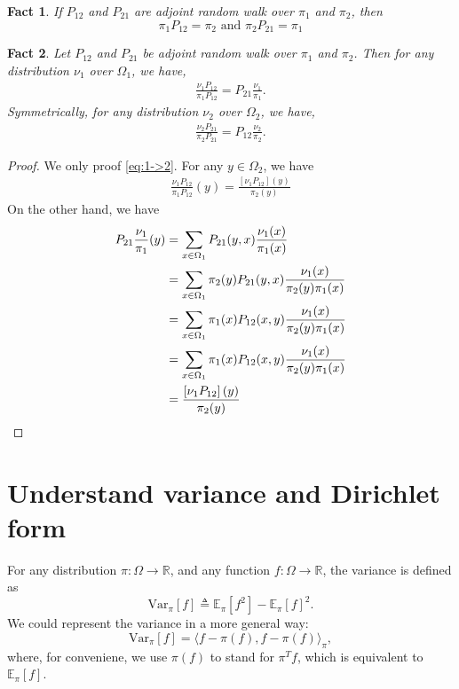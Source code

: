 \documentclass{article}
\newtheorem{fact}{Fact}
\def\<{\langle}
\def\>{\rangle}
\def\Var{\mathrm{Var}}
\def\E{\mathbb{E}}
\begin{document}
\begin{fact}
  If $P_{12}$ and $P_{21}$ are \emph{adjoint random walk} over $\pi_1$ and $\pi_2$, then
  \[\pi_1P_{12} = \pi_2 \mbox{ and } \pi_2P_{21} = \pi_1\]
\end{fact}

\begin{fact}
  Let $P_{12}$ and $P_{21}$ be \emph{adjoint random walk} over $\pi_1$ and $\pi_2$.
  Then for any distribution $\nu_1$ over $\Omega_1$, we have,
  \begin{align} \label{eq:1->2}
    \frac{\nu_1 P_{12}}{\pi_1 P_{12}} = P_{21} \frac{\nu_1}{\pi_1}.
  \end{align}
  Symmetrically, for any distribution $\nu_2$ over $\Omega_2$, we have,
  \begin{align}
    \frac{\nu_2 P_{21}}{\pi_2 P_{21}} = P_{12} \frac{\nu_2}{\pi_2}.
  \end{align}
\end{fact}
\begin{proof}
  We only proof \eqref{eq:1->2}.
  For any $y \in \Omega_2$, we have
  \begin{align*}
    \frac{\nu_1 P_{12}}{\pi_1 P_{12}} (y) = \frac{\left[\nu_1P_{12}\right](y)}{\pi_2(y)}
  \end{align*}
  On the other hand, we have
  \begin{align*}
    P_{21}\frac{\nu_1}{\pi_1} (y)
    &= \sum_{x\in\Omega_1} P_{21}(y, x) \frac{\nu_1(x)}{\pi_1(x)} \\
    &= \sum_{x\in\Omega_1} \pi_2(y)P_{21}(y, x) \frac{\nu_1(x)}{\pi_2(y)\pi_1(x)} \\
    &= \sum_{x\in\Omega_1} \pi_1(x)P_{12}(x, y) \frac{\nu_1(x)}{\pi_2(y)\pi_1(x)} \\
    &= \sum_{x\in\Omega_1} \pi_1(x)P_{12}(x, y) \frac{\nu_1(x)}{\pi_2(y)\pi_1(x)} \\
    &= \frac{\left[\nu_1P_{12}\right](y)}{\pi_2(y)} \qedhere
  \end{align*}
\end{proof}

\section{Understand variance and Dirichlet form}
For any distribution $\pi: \Omega \to \mathbb{R}$, and any function $f: \Omega \to \mathbb{R}$, the variance is defined as
\[\Var_\pi[f] \triangleq \E_\pi[f^2] - \E_\pi[f]^2.\]
We could represent the variance in a more general way:
\[\Var_\pi[f] = \< f - \pi(f), f - \pi(f)\>_\pi,\]
where, for conveniene, we use $\pi(f)$ to stand for $\pi^T f$, which is equivalent to $\E_\pi[f]$.
\end{document}
